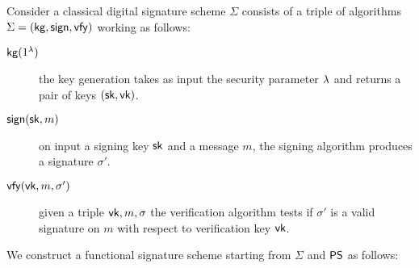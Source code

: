 \documentclass[11pt]{llncs}
\begin{document}
Consider a classical digital signature scheme $\Sigma$ consists of a triple of algorithms  $\Sigma=({\sf kg},{\sf sign},{\sf vfy})$ working as follows:
\begin{description}
  \item[${\sf kg}(1^{\lambda})$] the key generation takes as input the security parameter $\lambda$ and returns a pair of keys $({\sf sk},{\sf vk})$.
  \item[${\sf sign}({\sf sk}, m)$] on input a signing key ${\sf sk}$ and a message $m$, the signing algorithm produces 
  a signature $\sigma'$.
  \item[${\sf vfy}({\sf vk}, m, \sigma')$]  given a triple ${\sf vk},m,\sigma$ the verification algorithm tests if $\sigma'$ is a valid signature on $m$ with respect to verification key ${\sf vk}$.
\end{description} 

We construct a functional signature scheme starting from $\Sigma$ and ${\sf PS}$ as follows:\\

 

%
%
\end{document}

